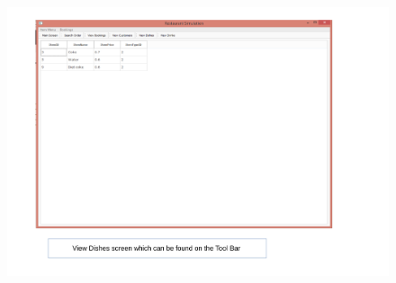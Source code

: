 \begin{landscape}
\begin{figure}[H]
    \includegraphics[height = 15cm]{./Maintenance/images/screen21}
    \caption{} \label{fig:screen21}
\end{figure}
\end{landscape}

